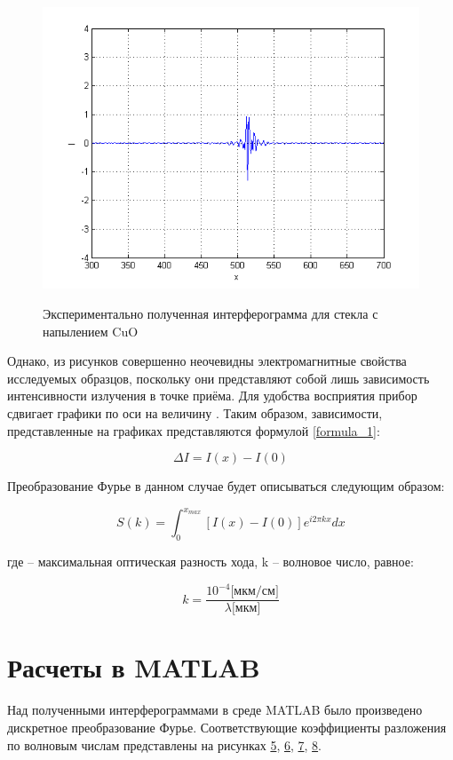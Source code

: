\documentclass[a4paper,12pt]{article} %
\begin{document}

    \begin{figure}[h!]
        \centering
        \includegraphics[width=0.48\linewidth]{4.png}
        \label{picture_4}
        \caption{Экспериментально полученная интерферограмма для стекла с напылением CuO}
    \end{figure}

    Однако, из рисунков совершенно неочевидны электромагнитные свойства исследуемых образцов, 
    поскольку они представляют собой лишь зависимость интенсивности излучения в точке приёма. 
    Для удобства восприятия прибор сдвигает графики по оси  на величину . 
    Таким образом, зависимости, представленные на графиках представляются формулой \eqref{formula_1}:

    \begin{equation} \label{formula_1}
        \Delta I = I(x) - I(0)
    \end{equation}

    Преобразование Фурье в данном случае будет описываться следующим образом:

    \begin{equation}
        S(k) = \int^{x_{max}}_{0} [I(x) - I(0)] e^{i 2 \pi kx} dx
    \end{equation}

    где – максимальная оптическая разность хода, k – волновое число, равное:

    \begin{equation}
        k = \frac{10^{-4} \text{[мкм/см]}}{\lambda \text{[мкм]}}
    \end{equation}

    \section{Расчеты в MATLAB}

    Над полученными интерферограммами в среде MATLAB было произведено дискретное преобразование Фурье. 
    Соответствующие коэффициенты разложения по волновым числам представлены на рисунках 
    \hyperref[picture_5]{5}, \hyperref[picture_6]{6}, \hyperref[picture_7]{7}, \hyperref[picture_8]{8}.
\end{document}
